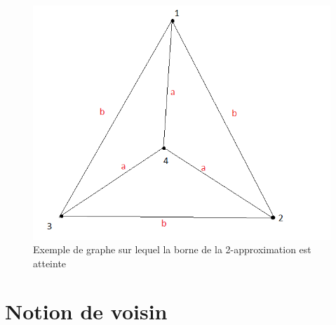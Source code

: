 \documentclass[10pt,a4paper]{article}
\begin{document}
\begin{figure}
\includegraphics[scale=.5]{images/exemple_borne}
\caption{Exemple de graphe sur lequel la borne de la 2-approximation est atteinte}
\label{exborne}
\end{figure}
\section{Notion de voisin}
\end{document}
